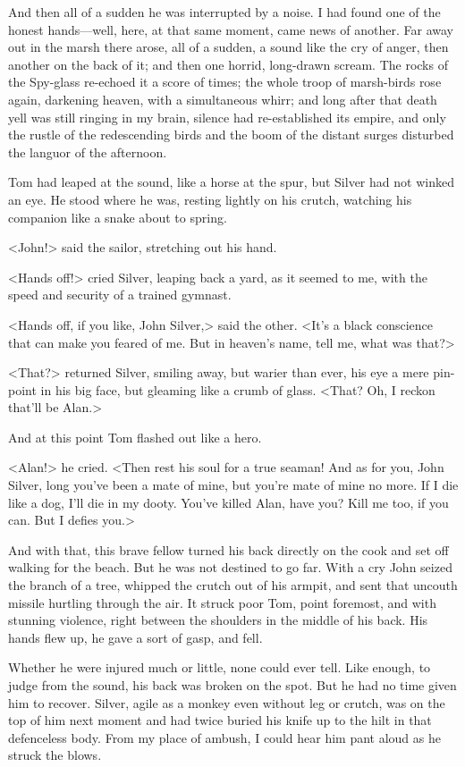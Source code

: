 And then all of a sudden he was interrupted by a noise. I had found one of the honest hands—well, here, at that same moment, came news of another. Far away out in the marsh there arose, all of a sudden, a sound like the cry of anger, then another on the back of it; and then one horrid, long-drawn scream. The rocks of the Spy-glass re-echoed it a score of times; the whole troop of marsh-birds rose again, darkening heaven, with a simultaneous whirr; and long after that death yell was still ringing in my brain, silence had re-established its empire, and only the rustle of the redescending birds and the boom of the distant surges disturbed the languor of the afternoon.

Tom had leaped at the sound, like a horse at the spur, but Silver had not winked an eye. He stood where he was, resting lightly on his crutch, watching his companion like a snake about to spring.

<John!> said the sailor, stretching out his hand.

<Hands off!> cried Silver, leaping back a yard, as it seemed to me, with the speed and security of a trained gymnast.

<Hands off, if you like, John Silver,> said the other. <It's a black conscience that can make you feared of me. But in heaven's name, tell me, what was that?>

<That?> returned Silver, smiling away, but warier than ever, his eye a mere pin-point in his big face, but gleaming like a crumb of glass. <That? Oh, I reckon that'll be Alan.>

And at this point Tom flashed out like a hero.

<Alan!> he cried. <Then rest his soul for a true seaman! And as for you, John Silver, long you've been a mate of mine, but you're mate of mine no more. If I die like a dog, I'll die in my dooty. You've killed Alan, have you? Kill me too, if you can. But I defies you.>

And with that, this brave fellow turned his back directly on the cook and set off walking for the beach. But he was not destined to go far. With a cry John seized the branch of a tree, whipped the crutch out of his armpit, and sent that uncouth missile hurtling through the air. It struck poor Tom, point foremost, and with stunning violence, right between the shoulders in the middle of his back. His hands flew up, he gave a sort of gasp, and fell.

Whether he were injured much or little, none could ever tell. Like enough, to judge from the sound, his back was broken on the spot. But he had no time given him to recover. Silver, agile as a monkey even without leg or crutch, was on the top of him next moment and had twice buried his knife up to the hilt in that defenceless body. From my place of ambush, I could hear him pant aloud as he struck the blows.

